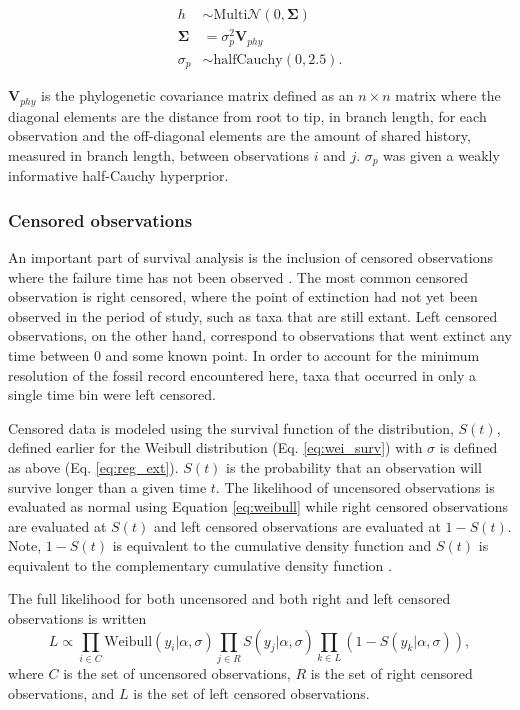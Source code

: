\documentclass[12pt,letterpaper]{article}
\begin{document}
\begin{align*}
  h &\sim \mathrm{Multi}\mathcal{N}(0, \mathbf{\Sigma}) \\
  \mathbf{\Sigma} &= \sigma_{p}^{2} \mathbf{V}_{phy} \\
  \sigma_{p} &\sim \mathrm{halfCauchy}(0, 2.5).
\end{align*}
 
\(\mathbf{V}_{phy}\) is the phylogenetic covariance matrix defined as an \(n \times n\) matrix where the diagonal elements are the distance from root to tip, in branch length, for each observation and the off-diagonal elements are the amount of shared history, measured in branch length, between observations \(i\) and \(j\). \(\sigma_{p}\) was given a weakly informative half-Cauchy hyperprior. 


\subsubsection{Censored observations} \label{sec:censor}

An important part of survival analysis is the inclusion of censored observations where the failure time has not been observed \citep{Ibrahim2001,Klein2003}. The most common censored observation is right censored, where the point of extinction had not yet been observed in the period of study, such as taxa that are still extant. Left censored observations, on the other hand, correspond to observations that went extinct any time between 0 and some known point. In order to account for the minimum resolution of the fossil record encountered here, taxa that occurred in only a single time bin were left censored.

Censored data is modeled using the survival function of the distribution, \(S(t)\), defined earlier for the Weibull distribution (Eq. \ref{eq:wei_surv}) with \(\sigma\) is defined as above (Eq. \ref{eq:reg_ext}). \(S(t)\) is the probability that an observation will survive longer than a given time \(t\). The likelihood of uncensored observations is evaluated as normal using Equation \ref{eq:weibull} while right censored observations are evaluated at \(S(t)\) and left censored observations are evaluated at \(1 - S(t)\). Note, \(1 - S(t)\) is equivalent to the cumulative density function and \(S(t)\) is equivalent to the complementary cumulative density function \citep{Gelman2013d}.

The full likelihood for both uncensored and both right and left censored observations is written
\begin{equation*}
  L \propto \prod_{i \in C} \mathrm{Weibull}(y_{i} | \alpha, \sigma) \prod_{j \in R} S(y_j | \alpha, \sigma) \prod_{k \in L} \left(1 - S(y_{k} | \alpha, \sigma)\right),
\end{equation*}
where \(C\) is the set of uncensored observations, \(R\) is the set of right censored observations, and \(L\) is the set of left censored observations.
\end{document}
